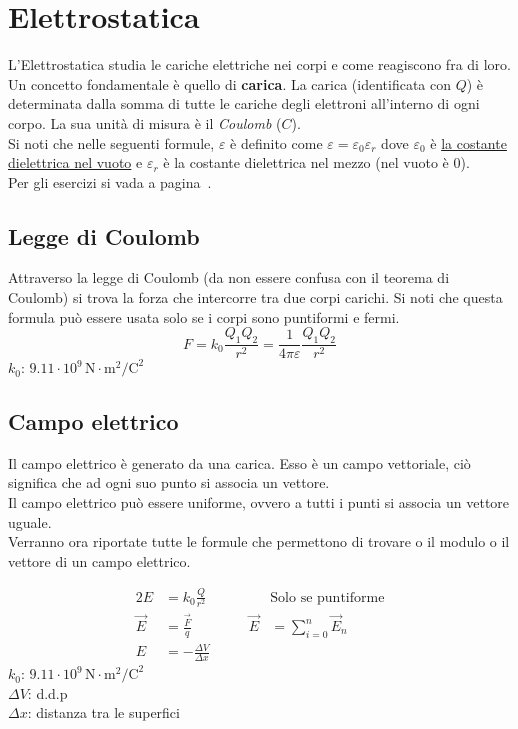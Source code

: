 
\section{Elettrostatica}\label{sec:elettrostatica}
L'Elettrostatica studia le cariche elettriche nei corpi e come reagiscono fra di loro.\\
Un concetto fondamentale è quello di \textbf{carica}. La carica (identificata con $Q$) è determinata 
dalla somma di tutte le cariche degli elettroni all'interno di ogni corpo. La sua unità di misura è il 
\emph{Coulomb} ($C$).\\[\baselineskip]
Si noti che nelle seguenti formule, $\varepsilon$ è definito come 
$\varepsilon = \varepsilon_0\varepsilon_r$ dove $\varepsilon_0$ è \hyperref[tab:e0]{la costante
dielettrica nel vuoto} e $\varepsilon_r$ è la costante dielettrica nel mezzo (nel vuoto è $0$).\\
Per gli esercizi si vada a pagina~\pageref{ex:elettrostatica}.

\subsection{Legge di Coulomb}
Attraverso la legge di Coulomb (da non essere confusa con il teorema di Coulomb) si trova la forza che 
intercorre tra due corpi carichi. Si noti che questa formula può essere usata solo se i corpi sono 
puntiformi e fermi.
\begin{equation*}
F = k_0\frac{Q_1Q_2}{r^2} = \frac{1}{4\pi\varepsilon}\frac{Q_1Q_2}{r^2}
\end{equation*}
\hyperref[tab:k0]{$k_0$}: $9.11\cdot10^9\,\text{N}\cdot\text{m}^2\text{/C}^2$

\subsection{Campo elettrico}
Il campo elettrico è generato da una carica. Esso è un campo vettoriale, ciò significa che ad ogni
suo punto si associa un vettore.\\ 
Il campo elettrico può essere uniforme, ovvero a tutti i punti si associa un vettore uguale.\\
Verranno ora riportate tutte le formule che permettono di trovare o il modulo o il vettore di un
campo elettrico.

\begin{alignat*}{2}
E &= k_0\frac{Q}{r^2} & &\text{Solo se puntiforme}\\
\vec{E} &= \frac{\vec{F}}{q} &\qquad \vec{E} &= \sum\limits_{i=0}^{n} \vec{E}_n\\
E &= -\frac{\Delta V}{\Delta x} & &
\end{alignat*}
\hyperref[tab:k0]{$k_0$}: $9.11\cdot10^9\,\text{N}\cdot\text{m}^2\text{/C}^2$\\
$\Delta V$: d.d.p\\
$\Delta x$: distanza tra le superfici

